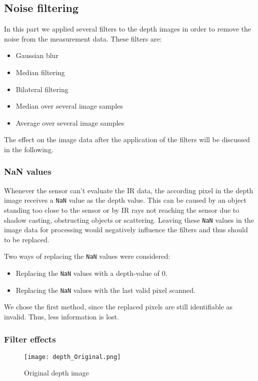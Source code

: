 \documentclass[DIV12,a4paper]{scrartcl}
\begin{document}
\subsection{Noise filtering}
\label{sec:filtering}
In this part we applied several filters to the depth images in order to remove the noise from the measurement data. These filters are:
\begin{itemize}
\item Gaussian blur
\item Median filtering
\item Bilateral filtering
\item Median over several image samples
\item Average over several image samples
\end{itemize}
The effect on the image data after the application of the filters will be discussed in the following.

\subsubsection{NaN values}
\label{sec:nan}
Whenever the sensor can't evaluate the IR data, the according pixel in the depth image receives a \texttt{NaN} value as the depth value. This can be caused by an object standing too close to the sensor or by IR rays not reaching the sensor due to shadow casting, obstructing objects or scattering. Leaving these \texttt{NaN} values in the image data for processing would negatively influence the filters and thus should to be replaced.\par
Two ways of replacing the \texttt{NaN} values were considered: 
\begin{itemize}
\item Replacing the \texttt{NaN} values with a depth-value of 0.
\item Replacing the \texttt{NaN} values with the last valid pixel scanned.
\end{itemize}
We chose the first method, since the replaced pixels are still identifiable as invalid. Thus, less information is lost.

\subsubsection{Filter effects}
\label{sec:filter_effects}
\begin{figure}[!htbp]
  \centering
  \texttt{[image: depth\_Original.png]}
  \caption{Original depth image}
  \label{fig:original_depth}
\end{figure}
\end{document}
